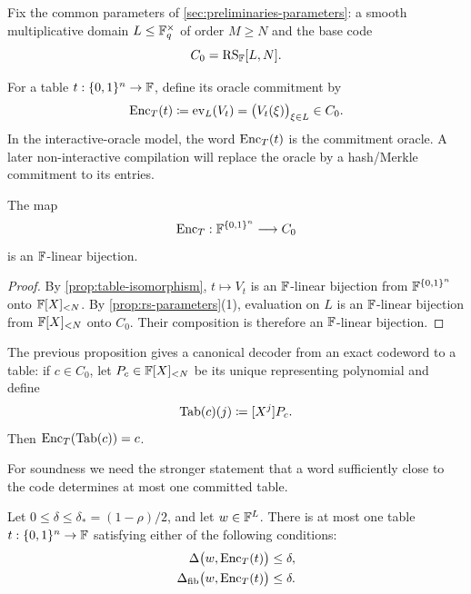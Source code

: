 Fix the common parameters of \cref{sec:preliminaries-parameters}: a smooth multiplicative domain $L\le\mathbb{F}_q^\times$ of order $M\ge N$ and the base code
\[
  C_0=\operatorname{RS}_{\mathbb{F}}[L,N].
\]

\begin{definition}
\label{def:table-commitment}
For a table $t:\{0,1\}^n\to\mathbb{F}$, define its oracle commitment by
\begin{equation}
  \operatorname{Enc}_T(t)
  \coloneqq
  \operatorname{ev}_L(V_t)
  =\bigl(V_t(\xi)\bigr)_{\xi\in L}
  \in C_0.
  \label{eq:table-commitment}
\end{equation}
In the interactive-oracle model, the word $\operatorname{Enc}_T(t)$ is the commitment oracle.  A later non-interactive compilation will replace the oracle by a hash/Merkle commitment to its entries.
\end{definition}

\begin{proposition}
\label{prop:table-commitment-bijection}
The map
\[
  \operatorname{Enc}_T:\mathbb{F}^{\{0,1\}^n}\longrightarrow C_0
\]
is an $\mathbb{F}$-linear bijection.
\end{proposition}

\begin{proof}
By \cref{prop:table-isomorphism}, $t\mapsto V_t$ is an $\mathbb{F}$-linear bijection from $\mathbb{F}^{\{0,1\}^n}$ onto $\mathbb{F}[X]_{<N}$.  By \cref{prop:rs-parameters}(1), evaluation on $L$ is an $\mathbb{F}$-linear bijection from $\mathbb{F}[X]_{<N}$ onto $C_0$.  Their composition is therefore an $\mathbb{F}$-linear bijection.
\end{proof}

The previous proposition gives a canonical decoder from an exact codeword to a table: if $c\in C_0$, let $P_c\in\mathbb{F}[X]_{<N}$ be its unique representing polynomial and define
\begin{equation}
  \operatorname{Tab}(c)(j)
  \coloneqq
  [X^j]P_c.
  \label{eq:codeword-table-decoder}
\end{equation}
Then $\operatorname{Enc}_T(\operatorname{Tab}(c))=c$.

For soundness we need the stronger statement that a word sufficiently close to the code determines at most one committed table.

\begin{proposition}
\label{prop:unique-table-near-word}
Let $0\le\delta\le\delta_*=(1-\rho)/2$, and let $w\in\mathbb{F}^L$.  There is at most one table $t:\{0,1\}^n\to\mathbb{F}$ satisfying either of the following conditions:
\begin{align}
  \Delta\bigl(w,\operatorname{Enc}_T(t)\bigr)&\le\delta,
  \label{eq:table-near-hamming}\\
  \Delta_{\mathrm{fib}}\bigl(w,\operatorname{Enc}_T(t)\bigr)&\le\delta.
  \label{eq:table-near-fibre}
\end{align}
\end{proposition}

